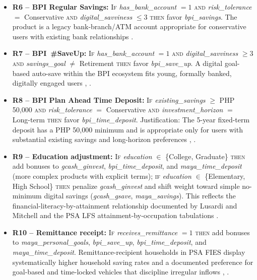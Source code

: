 \documentclass{icsthesis}
\begin{document}
\begin{mainmatter}
\begin{itemize}
					    \item \textbf{R6 -- BPI Regular Savings:} \textsc{If} \emph{has\_bank\_account} $= 1$ \textsc{and} \emph{risk\_tolerance} $=$ Conservative \textsc{and} \emph{digital\_savviness} $\leq 3$ \textsc{then} favor \emph{bpi\_savings}. The product is a legacy bank-branch/ATM account appropriate for conservative users with existing bank relationships \cite{ref37b}.
					    \item \textbf{R7 -- BPI~\#SaveUp:} \textsc{If} \emph{has\_bank\_account} $= 1$ \textsc{and} \emph{digital\_savviness} $\geq 3$ \textsc{and} \emph{savings\_goal} $\neq$ Retirement \textsc{then} favor \emph{bpi\_save\_up}. A digital goal-based auto-save within the BPI ecosystem fits young, formally banked, digitally engaged users \cite{ref37b}, \cite{ref63}.
					    \item \textbf{R8 -- BPI Plan Ahead Time Deposit:} \textsc{If} \emph{existing\_savings} $\geq$ PHP 50{,}000 \textsc{and} \emph{risk\_tolerance} $=$ Conservative \textsc{and} \emph{investment\_horizon} $=$ Long-term \textsc{then} favor \emph{bpi\_time\_deposit}. Justification: The 5-year fixed-term deposit has a PHP 50{,}000 minimum and is appropriate only for users with substantial existing savings and long-horizon preferences \cite{ref37b}, \cite{ref64}.
					    \item \textbf{R9 -- Education adjustment:} \textsc{If} \emph{education} $\in$ \{College, Graduate\} \textsc{then} add bonuses to \emph{gcash\_ginvest}, \emph{bpi\_time\_deposit}, and \emph{maya\_time\_deposit} (more complex products with explicit terms); \textsc{if} \emph{education} $\in$ \{Elementary, High School\} \textsc{then} penalize \emph{gcash\_ginvest} and shift weight toward simple no-minimum digital savings (\emph{gcash\_gsave}, \emph{maya\_savings}). This reflects the financial-literacy-by-attainment relationship documented by Lusardi and Mitchell \cite{ref43} and the PSA LFS attainment-by-occupation tabulations \cite{ref41}.
					    \item \textbf{R10 -- Remittance receipt:} \textsc{If} \emph{receives\_remittance} $= 1$ \textsc{then} add bonuses to \emph{maya\_personal\_goals}, \emph{bpi\_save\_up}, \emph{bpi\_time\_deposit}, and \emph{maya\_time\_deposit}. Remittance-recipient households in PSA FIES \cite{ref40} display systematically higher household saving rates and a documented preference for goal-based and time-locked vehicles that discipline irregular inflows \cite{ref35}, \cite{ref63}.
					\end{itemize}


\end{mainmatter}
\end{document}
